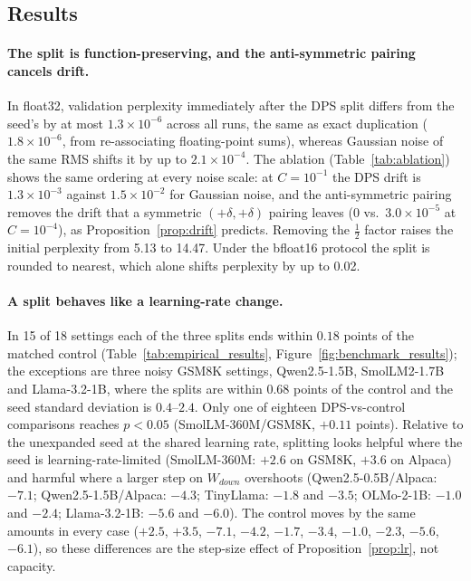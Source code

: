 \subsection{Results}
\label{sec:results}

\paragraph{The split is function-preserving, and the anti-symmetric pairing cancels drift.}
In float32, validation perplexity immediately after the DPS split differs from the seed's by at most $1.3\times10^{-6}$ across all runs, the same as exact duplication ($1.8\times10^{-6}$, from re-associating floating-point sums), whereas Gaussian noise of the same RMS shifts it by up to $2.1\times10^{-4}$. The ablation (Table~\ref{tab:ablation}) shows the same ordering at every noise scale: at $C{=}10^{-1}$ the DPS drift is $1.3\times10^{-3}$ against $1.5\times10^{-2}$ for Gaussian noise, and the anti-symmetric pairing removes the drift that a symmetric $(+\delta,+\delta)$ pairing leaves ($0$ vs.\ $3.0\times10^{-5}$ at $C{=}10^{-4}$), as Proposition~\ref{prop:drift} predicts. Removing the $\tfrac{1}{2}$ factor raises the initial perplexity from 5.13 to 14.47. Under the bfloat16 protocol the split is rounded to nearest, which alone shifts perplexity by up to 0.02.

\paragraph{A split behaves like a learning-rate change.}
In 15 of 18 settings each of the three splits ends within $0.18$ points of the matched control (Table~\ref{tab:empirical_results}, Figure~\ref{fig:benchmark_results}); the exceptions are three noisy GSM8K settings, Qwen2.5-1.5B, SmolLM2-1.7B and Llama-3.2-1B, where the splits are within $0.68$ points of the control and the seed standard deviation is $0.4$--$2.4$. Only one of eighteen DPS-vs-control comparisons reaches $p<0.05$ (SmolLM-360M/GSM8K, $+0.11$ points). Relative to the unexpanded seed at the shared learning rate, splitting looks helpful where the seed is learning-rate-limited (SmolLM-360M: $+2.6$ on GSM8K, $+3.6$ on Alpaca) and harmful where a larger step on $W_{down}$ overshoots (Qwen2.5-0.5B/Alpaca: $-7.1$; Qwen2.5-1.5B/Alpaca: $-4.3$; TinyLlama: $-1.8$ and $-3.5$; OLMo-2-1B: $-1.0$ and $-2.4$; Llama-3.2-1B: $-5.6$ and $-6.0$). The control moves by the same amounts in every case ($+2.5$, $+3.5$, $-7.1$, $-4.2$, $-1.7$, $-3.4$, $-1.0$, $-2.3$, $-5.6$, $-6.1$), so these differences are the step-size effect of Proposition~\ref{prop:lr}, not capacity.

